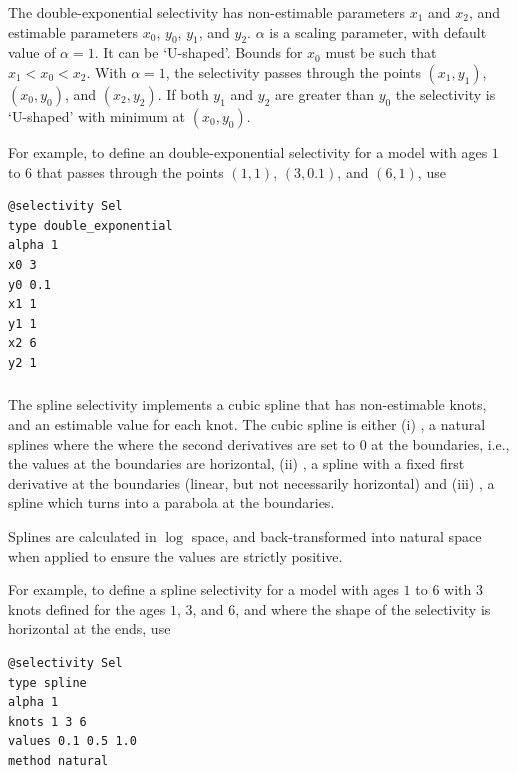 The double-exponential selectivity has non-estimable parameters $x_1$ and $x_2$, and estimable parameters $x_0$, $y_0$, $y_1$, and $y_2$.  $\alpha$ is a scaling parameter, with default value of $\alpha = 1$. It can be `U-shaped'. Bounds for $x_0$ must be such that $x_1 < x_0 < x_2$. With $\alpha=1$, the selectivity passes through the points $(x_1, y_1)$, $(x_0, y_0)$, and $(x_2, y_2)$. If both $y_1$ and $y_2$ are greater than $y_0$ the selectivity is `U-shaped' with minimum at $(x_0, y_0)$.

For example, to define an double-exponential selectivity for a model with ages $1$ to $6$ that passes through the points $(1,1)$, $(3,0.1)$, and $(6,1)$, use 

{\small{\begin{verbatim}
@selectivity Sel
type double_exponential
alpha 1
x0 3
y0 0.1
x1 1
y1 1
x2 6
y2 1
\end{verbatim}}}

\subsubsection[Spline]{}

The spline selectivity implements a cubic spline that has non-estimable knots, and an estimable value for each knot. The cubic spline is either (i) , a natural splines where the where the second derivatives are set to 0 at the boundaries, i.e., the values at the boundaries are horizontal, (ii) , a spline with a fixed first derivative at the boundaries (linear, but not necessarily horizontal) and (iii) , a spline which turns into a parabola at the boundaries.

Splines are calculated in $\log$ space, and back-transformed into natural space when applied to ensure the values are strictly positive.

For example, to define a spline selectivity for a model with ages $1$ to $6$ with $3$ knots defined for the ages $1$, $3$, and $6$, and where the shape of the selectivity is horizontal at the ends, use

{\small{\begin{verbatim}
@selectivity Sel
type spline
alpha 1
knots 1 3 6
values 0.1 0.5 1.0
method natural
\end{verbatim}}}
